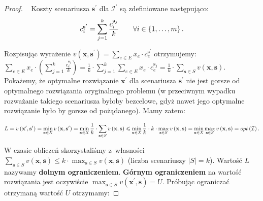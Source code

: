 \begin{proof}~\cite[$430$]{minmaxSurvey}
	Koszty scenariusza $\textbf{s}^{\prime}$ dla $\mathcal{I}^{\prime}$ są zdefiniowane następująco:
	\begin{equation}
		c^{\textbf{s}^{\prime}}_{i} = \sum_{\mathclap{j = 1}}^{k} \frac{c_{i}^{\textbf{s}_{j}}}{k} \qquad \forall i \in \left\{ 1, \dots, m \right\}\text{.}
	\end{equation}
	
	Rozpisując wyrażenie $v \left( \textbf{x}, \textbf{s}^{\prime} \right) = \sum_{e \in E} x_{e} \cdot c^{\textbf{s}^{\prime}}_{e}$ otrzymujemy: $\sum_{e \in E} x_{e} \cdot \left( \sum_{j = 1}^{k} \frac{c_{e}^{\textbf{s}_{j}}}{k} \right) = \frac{1}{k} \cdot \sum_{j = 1}^{k} \sum_{e \in E} x_{e} \cdot c^{\textbf{s}_{j}}_{e} = \frac{1}{k} \cdot \sum_{\textbf{s} \in S} v \left( \textbf{x}, \textbf{s} \right)$.
	Pokażemy, że optymalne rozwiązanie $\textbf{x}^{\prime}$ dla scenariusza $\textbf{s}^{\prime}$ nie jest gorsze od optymalnego rozwiązania oryginalnego problemu (w przeciwnym wypadku rozważanie takiego scenariusza byłoby bezcelowe, gdyż nawet jego optymalne rozwiązanie było by gorsze od pożądanego).
	Mamy zatem:
	
	\begin{equation}
		L = v \left( \textbf{x}^{\prime}, \textbf{s}^{\prime} \right) = \min_{\mathclap{\textbf{x} \in X}} v \left( \textbf{x}, \textbf{s}^{\prime} \right) = \min_{ \mathclap{\textbf{x} \in X}} \frac{1}{k} \cdot \sum_{\textbf{s} \in S} v \left( \textbf{x}, \textbf{s} \right) \leqslant \min_{ \mathclap{\textbf{x} \in X}} \frac{1}{k} \cdot k \cdot \max_{\textbf{s} \in S} v \left( \textbf{x}, \textbf{s} \right) = \min_{ \mathclap{\textbf{x} \in X}} \max_{\textbf{s} \in S} v \left( \textbf{x}, \textbf{s} \right) = opt \left( \mathcal{I}\right)\text{.}
	\end{equation}
	
	W czasie obliczeń skorzystaliśmy z~własności $\sum_{\textbf{s} \in S} v \left( \textbf{x}, \textbf{s} \right) \leqslant k \cdot \max_{\textbf{s} \in S} v \left( \textbf{x}, \textbf{s} \right)$ (liczba scenariuszy $\left| S \right| = k$).
	Wartość $L$ nazywamy \textbf{dolnym ograniczeniem}.
	\textbf{Górnym ograniczeniem} na wartość rozwiązania jest oczywiście $\max_{\textbf{s} \in S} v \left( \textbf{x}^{\prime}, \textbf{s} \right) = U$.
	Próbując ograniczać otrzymaną wartość $U$ otrzymamy:
	

\end{proof}
